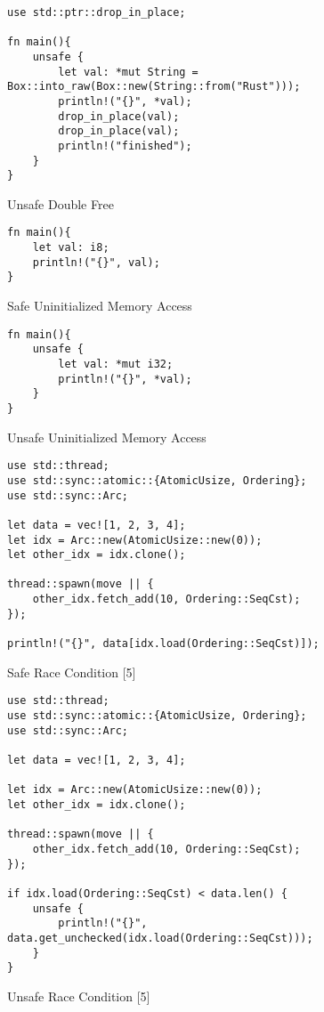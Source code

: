 \documentclass[sigconf,authorversion,nonacm]{acmart}
\begin{document}
\begin{figure} [H] 
\caption{Unsafe Double Free}
    \begin{lstlisting}
use std::ptr::drop_in_place;

fn main(){
    unsafe {
        let val: *mut String = Box::into_raw(Box::new(String::from("Rust")));
        println!("{}", *val);
        drop_in_place(val);
        drop_in_place(val);
        println!("finished");
    }
}
    \end{lstlisting}
\end{figure}

\begin{figure} [H] 
\caption{Safe Uninitialized Memory Access}
    \begin{lstlisting}
fn main(){
    let val: i8;
    println!("{}", val);
}
    \end{lstlisting}
\end{figure}

\begin{figure} [H] 
\caption{Unsafe Uninitialized Memory Access}
    \begin{lstlisting}
fn main(){
    unsafe {
        let val: *mut i32;
        println!("{}", *val);
    }
}
    \end{lstlisting}
\end{figure}

\begin{figure} [H] 
\caption{Safe Race Condition [5]}
    \begin{lstlisting}
use std::thread;
use std::sync::atomic::{AtomicUsize, Ordering};
use std::sync::Arc;

let data = vec![1, 2, 3, 4];
let idx = Arc::new(AtomicUsize::new(0));
let other_idx = idx.clone();

thread::spawn(move || {
    other_idx.fetch_add(10, Ordering::SeqCst);
});

println!("{}", data[idx.load(Ordering::SeqCst)]);
    \end{lstlisting}
\end{figure}

\begin{figure} [H] 
\caption{Unsafe Race Condition [5]}
    \begin{lstlisting}
use std::thread;
use std::sync::atomic::{AtomicUsize, Ordering};
use std::sync::Arc;

let data = vec![1, 2, 3, 4];

let idx = Arc::new(AtomicUsize::new(0));
let other_idx = idx.clone();

thread::spawn(move || {
    other_idx.fetch_add(10, Ordering::SeqCst);
});

if idx.load(Ordering::SeqCst) < data.len() {
    unsafe {
        println!("{}", data.get_unchecked(idx.load(Ordering::SeqCst)));
    }
}
    \end{lstlisting}
\end{figure}
\end{document}
